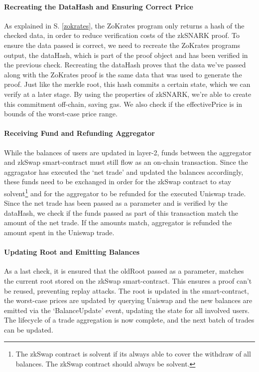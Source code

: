\documentclass[../../thesis.tex]{subfiles}
\begin{document}
\paragraph{Recreating the DataHash and Ensuring Correct Price}
As explained in S. \ref{zokrates}, the ZoKrates program only returns a hash of the checked data, in order to reduce verification costs of the zkSNARK proof. To ensure the data passed is correct, we need to recreate the ZoKrates programs output, the dataHash, which is part of the proof object and has been verified in the previous check. Recreating the dataHash proves that the data we've passed along with the ZoKrates proof is the same data that was used to generate the proof. Just like the merkle root, this hash commits a certain state, which we can verify at a later stage. By using the properties of zkSNARK, we're able to create this commitment off-chain, saving gas. We also check if the effectivePrice is in bounds of the worst-case price range. 

\paragraph{Receiving Fund and Refunding Aggregator}
While the balances of users are updated in layer-2, funds between the aggregator and zkSwap smart-contract must still flow as an on-chain transaction. Since the aggragator has executed the `net trade' and updated the balances accordingly, these funds need to be exchanged in order for the zkSwap contract to stay solvent\footnote{The zkSwap contract is solvent if its always able to cover the withdraw of all balances. The zkSwap contract should always be solvent.} and for the aggregator to be refunded for the executed Uniswap trade. Since the net trade has been passed as a parameter and is verified by the dataHash, we check if the funds passed as part of this transaction match the amount of the net trade. If the amounts match, aggregator is refunded the amount spent in the Uniswap trade. 

\paragraph{Updating Root and Emitting Balances}
As a last check, it is ensured that the oldRoot passed as a parameter, matches the current root stored on the zkSwap smart-contract. This ensures a proof can't be reused, preventing replay attacks. The root is updated in the smart-contract, the worst-case prices are updated by querying Uniswap and the new balances are emitted via the `BalanceUpdate' event, updating the state for all involved users. The lifecycle of a trade aggregation is now complete, and the next batch of trades can be updated. 
\end{document}
